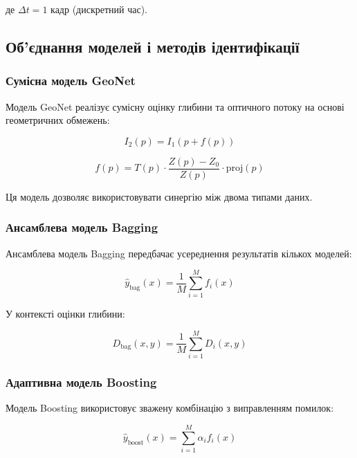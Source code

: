 \documentclass[14pt, a4paper]{extarticle}
\numberwithin{equation}{section}
\begin{document}
де $\Delta t = 1$ кадр (дискретний час).

\subsection{Об'єднання моделей і методів ідентифікації}

\subsubsection{Сумісна модель GeoNet}

Модель GeoNet реалізує сумісну оцінку глибини та оптичного потоку на основі геометричних обмежень:

\begin{equation}
\boxed{I_2(p) = I_1(p + f(p))} \tag{43}
\end{equation}

\begin{equation}
f(p) = T(p) \cdot \frac{Z(p) - Z_0}{Z(p)} \cdot \text{proj}(p) \tag{44}
\end{equation}

Ця модель дозволяє використовувати синергію між двома типами даних.

\subsubsection{Ансамблева модель Bagging}

Ансамблева модель Bagging передбачає усереднення результатів кількох моделей:

\begin{equation}
\boxed{\hat{y}_{\text{bag}}(x) = \frac{1}{M} \sum_{i=1}^{M} f_i(x)} \tag{45}
\end{equation}

У контексті оцінки глибини:

\begin{equation}
D_{\text{bag}}(x,y) = \frac{1}{M} \sum_{i=1}^{M} D_i(x,y) \tag{46}
\end{equation}

\subsubsection{Адаптивна модель Boosting}

Модель Boosting використовує зважену комбінацію з виправленням помилок:

\begin{equation}
\hat{y}_{\text{boost}}(x) = \sum_{i=1}^{M} \alpha_i f_i(x) \tag{47}
\end{equation}
\end{document}
